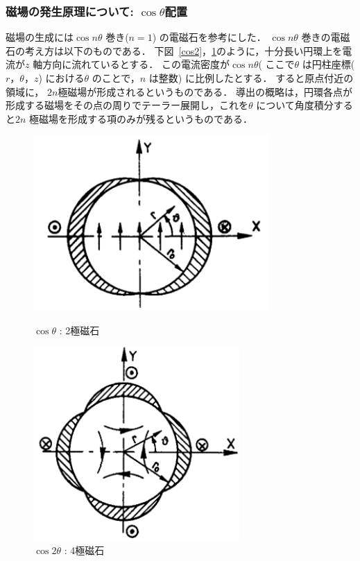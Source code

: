 \subsubsection{磁場の発生原理について: $\cos \theta$配置}
磁場の生成には$\cos n\theta$ 巻き($n=1$) の電磁石を参考にした．
$\cos n \theta$ 巻きの電磁石の考え方は以下のものである．
下図~\ref{cos2}，\ref{cos4}のように，十分長い円環上を電流が$z$ 軸方向に流れているとする．
この電流密度が$\cos n\theta$( ここで$\theta$ は円柱座標($r，\theta，z$) における$\theta$ のことで，$n$ は整数) に比例したとする．
すると原点付近の領域に， $2n$極磁場が形成されるというものである．
導出の概略は，円環各点が形成する磁場をその点の周りでテーラー展開し，これを$\theta$ について角度積分すると$2n$ 極磁場を形成する項のみが残るというものである．

\begin{figure}[H]
  \begin{minipage}{0.45\hsize}
    \begin{center}
      \includegraphics[width=0.8\textwidth]{figure/tajima/cos.png}
    \end{center}
    \caption{$\cos\theta$ : 2極磁石}
    \label{cos2}
  \end{minipage}
  \hfill
  \begin{minipage}{0.45\hsize}
    \begin{center}
      \includegraphics[width=0.7\textwidth]{figure/tajima/cos2.png}
    \end{center}
    \caption{$\cos2\theta$ : 4極磁石}
    \label{cos4}
  \end{minipage}
\end{figure}


